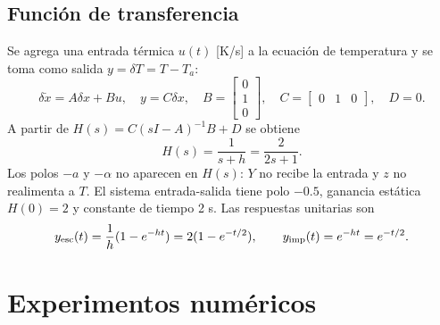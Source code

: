 \documentclass[11pt,a4paper]{article}
\begin{document}
\subsection{Función de transferencia}
Se agrega una entrada térmica $u(t)$ [K/s] a la ecuación de temperatura y se toma como salida $y=\delta T=T-T_a$:
\[
\delta\dot{x}=A\delta x+Bu,\quad y=C\delta x,\quad
B=\begin{bmatrix}0\\1\\0\end{bmatrix},\quad C=\begin{bmatrix}0&1&0\end{bmatrix},\quad D=0.
\]
A partir de $H(s)=C(sI-A)^{-1}B+D$ se obtiene
\begin{equation}H(s)=\frac{1}{s+h}=\frac{2}{2s+1}.\end{equation}
Los polos $-a$ y $-\alpha$ no aparecen en $H(s)$: $Y$ no recibe la entrada y $z$ no realimenta a $T$. El sistema entrada-salida tiene polo $-0.5$, ganancia estática $H(0)=2$ y constante de tiempo 2 s. Las respuestas unitarias son
\[
y_{\rm esc}(t)=\frac1h(1-e^{-ht})=2(1-e^{-t/2}),\qquad
y_{\rm imp}(t)=e^{-ht}=e^{-t/2}.
\]
\section{Experimentos numéricos}
\end{document}
